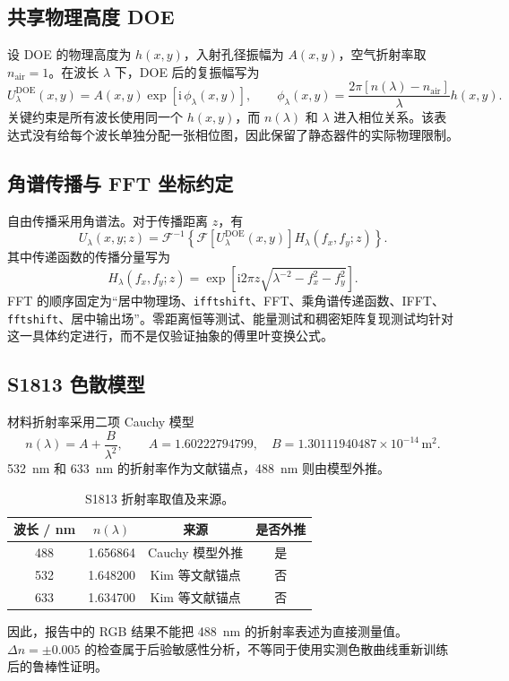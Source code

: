 \documentclass[UTF8,a4paper,12pt]{ctexart}
\begin{document}
\subsection{共享物理高度 DOE}
设 DOE 的物理高度为 $h(x,y)$，入射孔径振幅为 $A(x,y)$，空气折射率取 $n_{\mathrm{air}}=1$。在波长 $\lambda$ 下，DOE 后的复振幅写为
\begin{equation}
U_{\lambda}^{\mathrm{DOE}}(x,y)=A(x,y)\exp\left[\mathrm{i}\,\phi_{\lambda}(x,y)\right],\qquad
\phi_{\lambda}(x,y)=\frac{2\pi\left[n(\lambda)-n_{\mathrm{air}}\right]}{\lambda}h(x,y).
\label{eq:doe-phase}
\end{equation}
关键约束是所有波长使用同一个 $h(x,y)$，而 $n(\lambda)$ 和 $\lambda$ 进入相位关系。该表达式没有给每个波长单独分配一张相位图，因此保留了静态器件的实际物理限制。

\subsection{角谱传播与 FFT 坐标约定}
自由传播采用角谱法。对于传播距离 $z$，有
\begin{equation}
U_{\lambda}(x,y;z)=\mathcal{F}^{-1}\left\{\mathcal{F}\left[U_{\lambda}^{\mathrm{DOE}}(x,y)\right]H_{\lambda}(f_x,f_y;z)\right\}.
\label{eq:angular-spectrum}
\end{equation}
其中传递函数的传播分量写为
\begin{equation}
H_{\lambda}(f_x,f_y;z)=\exp\left[\mathrm{i}2\pi z\sqrt{\lambda^{-2}-f_x^2-f_y^2}\right].
\end{equation}
FFT 的顺序固定为“居中物理场、\texttt{ifftshift}、FFT、乘角谱传递函数、IFFT、\texttt{fftshift}、居中输出场”。零距离恒等测试、能量测试和稠密矩阵复现测试均针对这一具体约定进行，而不是仅验证抽象的傅里叶变换公式。

\subsection{S1813 色散模型}
材料折射率采用二项 Cauchy 模型
\begin{equation}
n(\lambda)=A+\frac{B}{\lambda^2},\qquad A=1.60222794799,\quad B=1.30111940487\times10^{-14}\,\mathrm{m^2}.
\label{eq:cauchy}
\end{equation}
\SI{532}{nm} 和 \SI{633}{nm} 的折射率作为文献锚点，\SI{488}{nm} 则由模型外推。

\begin{table}[H]
\centering
\caption{S1813 折射率取值及来源。}
\label{tab:refractive-index}
\begin{tabular}{cccc}
\toprule
波长 / \si{nm} & $n(\lambda)$ & 来源 & 是否外推 \\
\midrule
488 & 1.656864 & Cauchy 模型外推 & 是 \\
532 & 1.648200 & Kim 等文献锚点 & 否 \\
633 & 1.634700 & Kim 等文献锚点 & 否 \\
\bottomrule
\end{tabular}
\end{table}
因此，报告中的 RGB 结果不能把 \SI{488}{nm} 的折射率表述为直接测量值。$\Delta n=\pm0.005$ 的检查属于后验敏感性分析，不等同于使用实测色散曲线重新训练后的鲁棒性证明。
\end{document}
